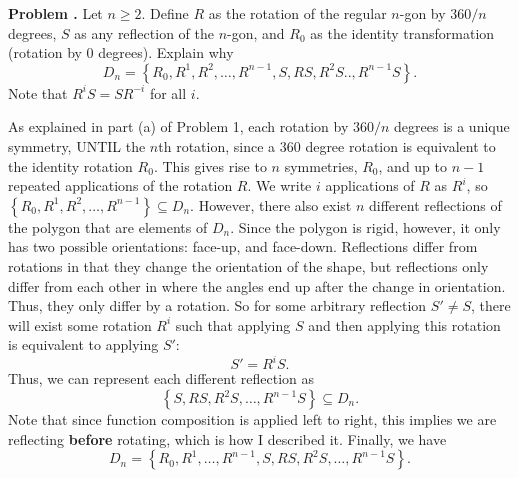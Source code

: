 \documentclass[11pt, letterpaper]{report}
\newcounter{prob}\setcounter{prob}{0}
\renewcommand{\theprob}{\textbf{Problem \arabic{prob}. }}
\newcommand{\problem}{\stepcounter{prob}\noindent\theprob}
\renewenvironment{solution}[1][]{\begin{bwaaa}}{\end{bwaaa}\vspace{10pt}}
\begin{document}
\newpage
\problem Let $n\geq 2$. Define $R$ as the rotation of the regular $n$-gon by $360/n$ degrees, $S$ as any reflection of the $n$-gon, and $R_0$ as the identity transformation (rotation by 0 degrees). Explain why
\[
	D_n =\left\{ R_0,R^1,R^2, \dots, R^{n-1} ,S,RS,R^2S ..,R^{n-1}S \right\}
.\]
Note that $R^iS=SR^{-i}$ for all $i$.
\begin{solution}
	As explained in part (a) of Problem 1, each rotation by $360/n$ degrees is a unique symmetry, UNTIL the $n$th rotation, since a $360$ degree rotation is equivalent to the identity rotation $R_0$. This gives rise to $n$ symmetries, $R_0$, and up to $n-1$ repeated applications of the rotation $R$. We write $i$ applications of $R$ as $R^{i}$, so $\left\{ R_0,R^1,R^2,\ldots,R^{n-1} \right\} \subseteq D_n$. However, there also exist $n$ different reflections of the polygon that are elements of $D_n$. Since the polygon is rigid, however, it only has two possible orientations: face-up, and face-down. Reflections differ from rotations in that they change the orientation of the shape, but reflections only differ from each other in where the angles end up after the change in orientation. Thus, they only differ by a rotation. So for some arbitrary reflection $S'\neq S$, there will exist some rotation $R^i$ such that applying $S$ and then applying this rotation is equivalent to applying $S'$:
	\[
		S'=R^iS
	.\]
	Thus, we can represent each different reflection as
	\[
		\left\{ S,RS,R^2S, \ldots,R^{n-1}S \right\} \subseteq D_n
	.\]
	Note that since function composition is applied left to right, this implies we are reflecting \textbf{before} rotating, which is how I described it. Finally, we have
	\[
		D_n = \left\{ R_0,R^1,\ldots,R^{n-1} ,S,RS,R^2 S, \ldots,R^{n-1}S\right\} 
	.\]
	
\end{solution}
\end{document}
